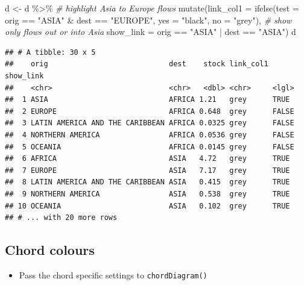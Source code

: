 \documentclass[
]{book}
\newenvironment{Shaded}{\begin{snugshade}}{\end{snugshade}}
\newcommand{\AttributeTok}[1]{\textcolor[rgb]{0.77,0.63,0.00}{#1}}
\newcommand{\CommentTok}[1]{\textcolor[rgb]{0.56,0.35,0.01}{\textit{#1}}}
\newcommand{\FunctionTok}[1]{\textcolor[rgb]{0.00,0.00,0.00}{#1}}
\newcommand{\NormalTok}[1]{#1}
\newcommand{\OtherTok}[1]{\textcolor[rgb]{0.56,0.35,0.01}{#1}}
\newcommand{\SpecialCharTok}[1]{\textcolor[rgb]{0.00,0.00,0.00}{#1}}
\newcommand{\StringTok}[1]{\textcolor[rgb]{0.31,0.60,0.02}{#1}}
\providecommand{\tightlist}{%
  \setlength{\itemsep}{0pt}\setlength{\parskip}{0pt}}
\begin{document}
\begin{Shaded}
\begin{Highlighting}[]
\NormalTok{d }\OtherTok{\textless{}{-}}\NormalTok{ d }\SpecialCharTok{\%\textgreater{}\%}
  \CommentTok{\# highlight Asia to Europe flows}
  \FunctionTok{mutate}\NormalTok{(}\AttributeTok{link\_col1 =} \FunctionTok{ifelse}\NormalTok{(}\AttributeTok{test =}\NormalTok{ orig }\SpecialCharTok{==} \StringTok{"ASIA"} \SpecialCharTok{\&}\NormalTok{ dest }\SpecialCharTok{==} \StringTok{"EUROPE"}\NormalTok{,}
                            \AttributeTok{yes =} \StringTok{"black"}\NormalTok{, }\AttributeTok{no =} \StringTok{"grey"}\NormalTok{),}
         \CommentTok{\# show only flows out or into Asia}
         \AttributeTok{show\_link =}\NormalTok{ orig }\SpecialCharTok{==} \StringTok{"ASIA"} \SpecialCharTok{|}\NormalTok{ dest }\SpecialCharTok{==} \StringTok{"ASIA"}\NormalTok{)}
\NormalTok{d}
\end{Highlighting}
\end{Shaded}

\begin{verbatim}
## # A tibble: 30 x 5
##    orig                            dest    stock link_col1 show_link
##    <chr>                           <chr>   <dbl> <chr>     <lgl>    
##  1 ASIA                            AFRICA 1.21   grey      TRUE     
##  2 EUROPE                          AFRICA 0.648  grey      FALSE    
##  3 LATIN AMERICA AND THE CARIBBEAN AFRICA 0.0325 grey      FALSE    
##  4 NORTHERN AMERICA                AFRICA 0.0536 grey      FALSE    
##  5 OCEANIA                         AFRICA 0.0145 grey      FALSE    
##  6 AFRICA                          ASIA   4.72   grey      TRUE     
##  7 EUROPE                          ASIA   7.17   grey      TRUE     
##  8 LATIN AMERICA AND THE CARIBBEAN ASIA   0.415  grey      TRUE     
##  9 NORTHERN AMERICA                ASIA   0.538  grey      TRUE     
## 10 OCEANIA                         ASIA   0.102  grey      TRUE     
## # ... with 20 more rows
\end{verbatim}

\hypertarget{chord-colours-1}{%
\subsection{Chord colours}\label{chord-colours-1}}

\begin{itemize}
\tightlist
\item
  Pass the chord specific settings to \texttt{chordDiagram()}
\end{itemize}
\end{document}
